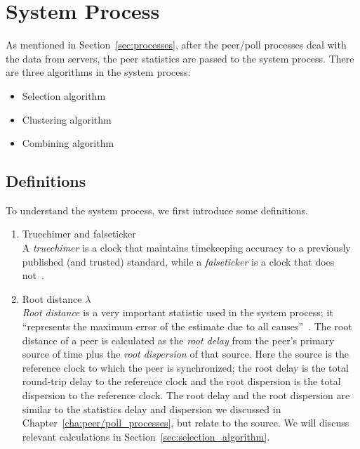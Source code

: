 

\chapter{System Process}
\label{cha:system_process}

As mentioned in Section~\ref{sec:processes}, after the peer/poll processes deal
with the data from servers, the peer statistics are passed to the system
process.  There are three algorithms in the system process:
\begin{itemize}
    \item Selection algorithm
    \item Clustering algorithm
    \item Combining algorithm
\end{itemize}

\section{Definitions}%
\label{sec:system_concepts}
To understand the system process, we first introduce some definitions.

\begin{enumerate}
    \item Truechimer and falseticker\\
        A \emph{truechimer} is a clock that maintains timekeeping accuracy to a
        previously published (and trusted) standard, while a \emph{falseticker}
        is a clock that does not~\cite{redbook}.
    \item Root distance $\lambda$\\
        \emph{Root distance} is a very important statistic used in the system
        process; it ``represents the maximum error of the estimate due to all
        causes''~\cite{performance_metrics}. The root distance of a peer is
        calculated as the \emph{root delay} from the peer's primary source of
        time plus the \emph{root dispersion} of that source. Here the source is
        the reference clock to which the peer is synchronized; the root delay
        is the total round-trip delay to the reference clock and the root
        dispersion is the total dispersion to the reference clock. The root
        delay and the root dispersion are similar to the statistics delay and
        dispersion we discussed in Chapter~\ref{cha:peer/poll_processes}, but
        relate to the source. We will discuss relevant calculations in
        Section~\ref{sec:selection_algorithm}.
\end{enumerate}

